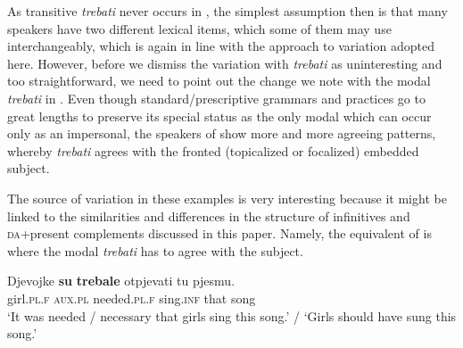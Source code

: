 \documentclass[output=paper,modfonts,newtxmath,hidelinks,]{langscibook}
\begin{document}
As transitive \textit{trebati} never occurs in , the simplest assumption then is that many  speakers have two different lexical items, which some of them may use interchangeably, which is again in line with the approach to variation adopted here. However, before we dismiss the variation with \textit{trebati} as uninteresting and too straightforward, we need to point out the change we note with the modal \textit{trebati} in . Even though standard/prescriptive grammars and practices go to great lengths to preserve its special status as the only modal which can occur only as an impersonal, the speakers of   show more and more agreeing patterns, whereby \textit{trebati} agrees with the fronted (topicalized or focalized) embedded subject.

\ea \label{7:ex19}
	\z
\z

\noindent The source of variation in these examples is very interesting because it might be linked to the similarities and differences in the structure of infinitives and \textsc{da}+present complements discussed in this paper. Namely, the  equivalent of  is  where the modal \textit{trebati} has to agree with the subject.

\ea \label{7:ex20}
\gll Djevojke \textbf{su} \textbf{trebale} otpjevati tu pjesmu.\\
     girl.\textsc{pl.f} \textsc{aux.pl} needed.\textsc{pl.f} sing.\textsc{inf} that song\\
\glt `It was needed / necessary that girls sing this song.' / `Girls should have sung this song.'
\z
\end{document}
